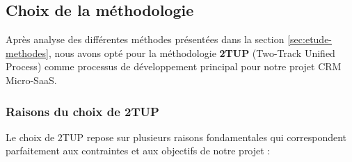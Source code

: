 \subsection{Choix de la méthodologie}
Après analyse des différentes méthodes présentées dans la section \ref{sec:etude-methodes}, nous avons opté pour la méthodologie \textbf{2TUP} (Two-Track Unified Process) comme processus de développement principal pour notre projet CRM Micro-SaaS.

\subsubsection{Raisons du choix de 2TUP}
Le choix de 2TUP repose sur plusieurs raisons fondamentales qui correspondent parfaitement aux contraintes et aux objectifs de notre projet :

